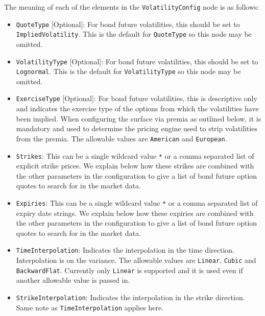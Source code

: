 The meaning of each of the elements in the \lstinline!VolatilityConfig! node is as follows:
\begin{itemize}

\item \lstinline!QuoteType! [Optional]:
  For bond future volatilities, this should be set to \lstinline!ImpliedVolatility!.
  This is the default for \lstinline!QuoteType! so this node may be omitted.

\item \lstinline!VolatilityType! [Optional]:
  For bond future volatilities, this should be set to \lstinline!Lognormal!.
  This is the default for \lstinline!VolatilityType! so this node may be omitted.

\item \lstinline!ExerciseType! [Optional]:
  For bond future volatilities, this is descriptive only and indicates the exercise type of the options from which the 
  volatilities have been implied. When configuring the surface via premia as outlined below, it is mandatory and used 
  to determine the pricing engine used to strip volatilities from the premia.
  The allowable values are \lstinline!American! and \lstinline!European!.

\item \lstinline!Strikes!:
  This can be a single wildcard value \lstinline!*! or a comma separated list of explicit strike prices.
  We explain below how these strikes are combined with the other parameters in the configuration to give a list of 
  bond future option quotes to search for in the market data.

\item \lstinline!Expiries!:
  This can be a single wildcard value \lstinline!*! or a comma separated list of expiry date strings.
  We explain below how these expiries are combined with the other parameters in the configuration to give a list of 
  bond future option quotes to search for in the market data.

\item \lstinline!TimeInterpolation!:
  Indicates the interpolation in the time direction. Interpolation is on the variance.
  The allowable values are \lstinline!Linear!, \lstinline!Cubic! and \lstinline!BackwardFlat!.
  Currently only \lstinline!Linear! is supported and it is used even if another allowable value is passed in.

\item \lstinline!StrikeInterpolation!:
  Indicates the interpolation in the strike direction. Same note as \lstinline!TimeInterpolation! applies here.


\end{itemize}
